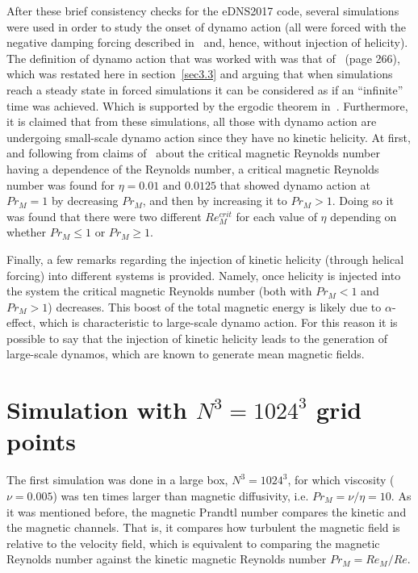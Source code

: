 \documentclass[12pt,a4paper]{report}
\begin{document}
After these brief consistency checks for the eDNS2017 code, several simulations were used in order to study the onset of dynamo action (all were forced with the negative damping forcing described in~\cite{chalupa2017comparison} and, hence, without injection of helicity). The definition of dynamo action that was worked with was that of~\cite{schnack2009lectures} (page 266), which was restated here in section~\ref{sec3.3} and arguing that when simulations reach a steady state in forced simulations it can be considered as if an ``infinite'' time was achieved. Which is supported by the ergodic theorem in~\cite{biskamp1997nonlinear}. Furthermore, it is claimed that from these simulations, all those with dynamo action are undergoing small-scale dynamo action since they have no kinetic helicity. At first, and following from claims of~\cite{schekochihin2004critical} about the critical magnetic Reynolds number having a dependence of the Reynolds number, a critical magnetic Reynolds number was found for $\eta=0.01 \text{ and } 0.0125$ that showed dynamo action at $Pr_M=1$ by decreasing $Pr_M$, and then by increasing it to $Pr_M > 1$. Doing so it was found that there were two different $Re_M^{crit}$ for each value of $\eta$ depending on whether $Pr_M \leq 1$ or $Pr_M \geq 1$. 

Finally, a few remarks regarding the injection of kinetic helicity (through helical forcing) into different systems is provided. Namely, once helicity is injected into the system the critical magnetic Reynolds number (both with $Pr_M < 1$ and $Pr_M > 1$) decreases. This boost of the total magnetic energy is likely due to $\alpha$-effect, which is characteristic to large-scale dynamo action. For this reason it is possible to say that the injection of kinetic helicity leads to the generation of large-scale dynamos, which are known to generate mean magnetic fields.

\section{Simulation with $N^3=1024^3$ grid points}

The first simulation was done in a large box, $N^3=1024^3$, for which viscosity ($\nu=0.005$) was ten times larger than magnetic diffusivity, i.e. $Pr_M=\nu/\eta=10$. As it was mentioned before, the magnetic Prandtl number compares the kinetic and the magnetic channels. That is, it compares how turbulent the magnetic field is relative to the velocity field, which is equivalent to comparing the magnetic Reynolds number against the kinetic magnetic Reynolds number $Pr_M=Re_M/Re$.  
\end{document}
